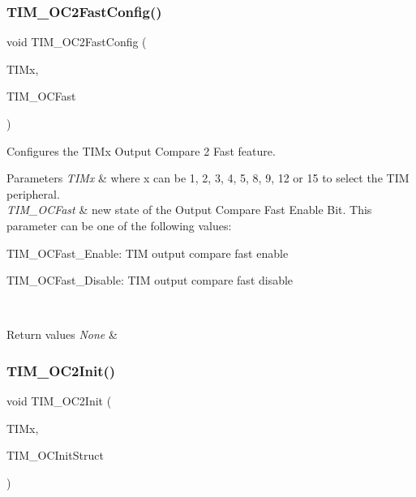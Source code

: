 \subsubsection{\texorpdfstring{TIM\_OC2FastConfig()}{TIM\_OC2FastConfig()}}
{\footnotesize\ttfamily void T\+I\+M\+\_\+\+O\+C2\+Fast\+Config (\begin{DoxyParamCaption}\item[{\mbox{\hyperlink{struct_t_i_m___type_def}{T\+I\+M\+\_\+\+Type\+Def}} $\ast$}]{T\+I\+Mx,  }\item[{uint16\+\_\+t}]{T\+I\+M\+\_\+\+O\+C\+Fast }\end{DoxyParamCaption})}



Configures the T\+I\+Mx Output Compare 2 Fast feature. 


\begin{DoxyParams}{Parameters}
{\em T\+I\+Mx} & where x can be 1, 2, 3, 4, 5, 8, 9, 12 or 15 to select the T\+IM peripheral. \\
\hline
{\em T\+I\+M\+\_\+\+O\+C\+Fast} & new state of the Output Compare Fast Enable Bit. This parameter can be one of the following values\+: \begin{DoxyItemize}
\item T\+I\+M\+\_\+\+O\+C\+Fast\+\_\+\+Enable\+: T\+IM output compare fast enable \item T\+I\+M\+\_\+\+O\+C\+Fast\+\_\+\+Disable\+: T\+IM output compare fast disable \end{DoxyItemize}
\\
\hline
\end{DoxyParams}

\begin{DoxyRetVals}{Return values}
{\em None} & \\
\hline
\end{DoxyRetVals}
\mbox{\label{group___t_i_m___exported___functions_ga2017455121d910d6ff63ac6f219842c5}} 
\subsubsection{\texorpdfstring{TIM\_OC2Init()}{TIM\_OC2Init()}}
{\footnotesize\ttfamily void T\+I\+M\+\_\+\+O\+C2\+Init (\begin{DoxyParamCaption}\item[{\mbox{\hyperlink{struct_t_i_m___type_def}{T\+I\+M\+\_\+\+Type\+Def}} $\ast$}]{T\+I\+Mx,  }\item[{\mbox{\hyperlink{struct_t_i_m___o_c_init_type_def}{T\+I\+M\+\_\+\+O\+C\+Init\+Type\+Def}} $\ast$}]{T\+I\+M\+\_\+\+O\+C\+Init\+Struct }\end{DoxyParamCaption})}




